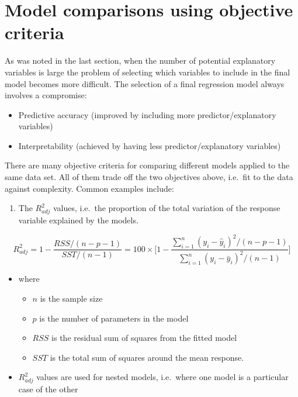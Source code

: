 \documentclass[
  letterpaper,
  DIV=11,
  numbers=noendperiod]{scrartcl}
\providecommand{\tightlist}{%
  \setlength{\itemsep}{0pt}\setlength{\parskip}{0pt}}\usepackage{longtable,booktabs,array}
\begin{document}
\section{Model comparisons using objective
criteria}\label{model-comparisons-using-objective-criteria}

As was noted in the last section, when the number of potential
explanatory variables is large the problem of selecting which variables
to include in the final model becomes more difficult. The selection of a
final regression model always involves a compromise:

\begin{itemize}
\tightlist
\item
  Predictive accuracy (improved by including more predictor/explanatory
  variables)
\item
  Interpretability (achieved by having less predictor/explanatory
  variables)
\end{itemize}

There are many objective criteria for comparing different models applied
to the same data set. All of them trade off the two objectives above,
i.e.~fit to the data against complexity. Common examples include:

\begin{enumerate}
\def\labelenumi{\arabic{enumi}.}
\tightlist
\item
  The \(R^2_{adj}\) values, i.e.~the proportion of the total variation
  of the response variable explained by the models.
\end{enumerate}

\[R_{adj}^2 = 1 - \frac{RSS/(n-p-1)}{SST/(n-1)} = 100 \times \Bigg[ 1-\frac{\sum_{i=1}^n(y_i-\widehat{y}_i)^2/(n-p-1)}{\sum_{i=1}^n(y_i-\bar y_i)^2/(n-1)}\Bigg]\]

\begin{itemize}
\tightlist
\item
  where

  \begin{itemize}
  \tightlist
  \item
    \(n\) is the sample size
  \item
    \(p\) is the number of parameters in the model
  \item
    \(RSS\) is the residual sum of squares from the fitted model
  \item
    \(SST\) is the total sum of squares around the mean response.
  \end{itemize}
\item
  \(R_{adj}^2\) values are used for nested models, i.e.~where one model
  is a particular case of the other
\end{itemize}
\end{document}
